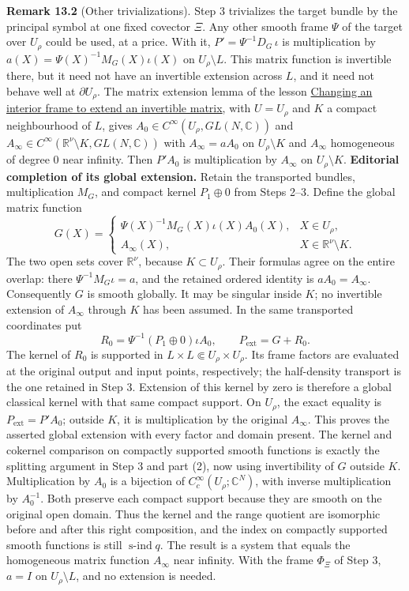 \documentclass[
  11pt,
]{article}
\begin{document}
\textbf{Remark 13.2} (Other trivializations). Step 3 trivializes the
target bundle by the principal symbol at one fixed covector \(\Xi\). Any
other smooth frame \(\Psi\) of the target over \(U_\rho\) could be used,
at a price. With it, \(P'=\Psi^{-1}D_G\,\iota\) is multiplication by
\(a(X)=\Psi(X)^{-1}M_G(X)\iota(X)\) on \(U_\rho\setminus L\). This
matrix function is invertible there, but it need not have an invertible
extension across \(L\), and it need not behave well at
\(\partial U_\rho\). The matrix extension lemma of the lesson
\href{matrix-extension.pdf}{Changing an interior frame to extend an
invertible matrix}, with \(U=U_\rho\) and \(K\) a compact neighbourhood
of \(L\), gives \(A_0\in C^\infty(U_\rho,GL(N,\mathbb C))\) and
\(A_\infty\in C^\infty(\mathbb R^\nu\setminus K,GL(N,\mathbb C))\) with
\(A_\infty=aA_0\) on \(U_\rho\setminus K\) and \(A_\infty\) homogeneous
of degree \(0\) near infinity. Then \(P'A_0\) is multiplication by
\(A_\infty\) on \(U_\rho\setminus K\). \textbf{Editorial completion of
its global extension.} Retain the transported bundles, multiplication
\(M_G\), and compact kernel \(P_1\oplus0\) from Steps 2--3. Define the
global matrix function \[
 G(X)=\begin{cases}
  \Psi(X)^{-1}M_G(X)\iota(X)A_0(X),&X\in U_\rho,\\
  A_\infty(X),&X\in\mathbb R^\nu\setminus K.
 \end{cases}
 \tag{BE1}
\] The two open sets cover \(\mathbb R^\nu\), because
\(K\subset U_\rho\). Their formulas agree on the entire overlap: there
\(\Psi^{-1}M_G\iota=a\), and the retained ordered identity is
\(aA_0=A_\infty\). Consequently \(G\) is smooth globally. It may be
singular inside \(K\); no invertible extension of \(A_\infty\) through
\(K\) has been assumed. In the same transported coordinates put \[
 R_0=\Psi^{-1}(P_1\oplus0)\iota A_0,\qquad
 P_{\mathrm{ext}}=G+R_0.
 \tag{BE2}
\] The kernel of \(R_0\) is supported in
\(L\times L\Subset U_\rho\times U_\rho\). Its frame factors are
evaluated at the original output and input points, respectively; the
half-density transport is the one retained in Step 3. Extension of this
kernel by zero is therefore a global classical kernel with that same
compact support. On \(U_\rho\), the exact equality is
\(P_{\mathrm{ext}}=P'A_0\); outside \(K\), it is multiplication by the
original \(A_\infty\). This proves the asserted global extension with
every factor and domain present. The kernel and cokernel comparison on
compactly supported smooth functions is exactly the splitting argument
in Step 3 and part (2), now using invertibility of \(G\) outside \(K\).
Multiplication by \(A_0\) is a bijection of
\(C_c^\infty(U_\rho;\mathbb C^N)\), with inverse multiplication by
\(A_0^{-1}\). Both preserve each compact support because they are smooth
on the original open domain. Thus the kernel and the range quotient are
isomorphic before and after this right composition, and the index on
compactly supported smooth functions is still \(\operatorname{s-ind}q\).
The result is a system that equals the homogeneous matrix function
\(A_\infty\) near infinity. With the frame \(\Phi_\Xi\) of Step 3,
\(a=I\) on \(U_\rho\setminus L\), and no extension is needed.
\end{document}
